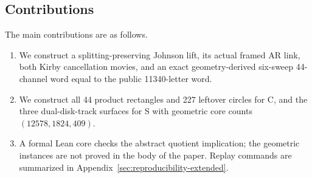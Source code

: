 \subsection*{Contributions}

The main contributions are as follows.
\begin{enumerate}
\item We construct a splitting-preserving Johnson lift, its actual framed AR
link, both Kirby cancellation movies, and an exact geometry-derived six-sweep
44-channel word equal to the public 11340-letter word.
\item We construct all 44 product rectangles and 227 leftover circles for C,
and the three dual-disk-track surfaces for S with geometric core counts
$(12578,1824,409)$.
\item A formal Lean core checks the abstract quotient implication; the
geometric instances are not proved in the body of the paper.  Replay
commands are summarized in Appendix~\ref{sec:reproducibility-extended}.
\end{enumerate}
